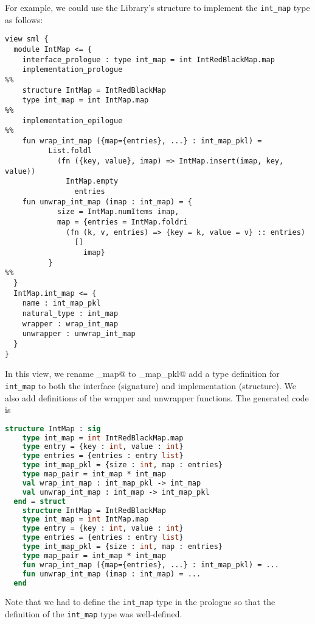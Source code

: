 For example, we could use the \smlnj{} Library's \lstinline@IntRedBlackMap@ structure
to implement the \lstinline!int_map! type as follows:
\begin{code}\begin{lstlisting}[language=ASDL]
view sml {
  module IntMap <= {
    interface_prologue : type int_map = int IntRedBlackMap.map
    implementation_prologue
%%
    structure IntMap = IntRedBlackMap
    type int_map = int IntMap.map
%%
    implementation_epilogue
%%
    fun wrap_int_map ({map={entries}, ...} : int_map_pkl) =
          List.foldl
            (fn ({key, value}, imap) => IntMap.insert(imap, key, value))
              IntMap.empty
                entries
    fun unwrap_int_map (imap : int_map) = {
            size = IntMap.numItems imap,
            map = {entries = IntMap.foldri
              (fn (k, v, entries) => {key = k, value = v} :: entries)
                []
                  imap}
          }
%%
  }
  IntMap.int_map <= {
    name : int_map_pkl
    natural_type : int_map
    wrapper : wrap_int_map
    unwrapper : unwrap_int_map
  }
}
\end{lstlisting}\end{code}%
In this view, we rename \lstinline@int_map@ to \lstinline@int_map_pkl@ add a type
definition for \lstinline!int_map! to both the interface
(signature) and implementation (structure).
We also add definitions of the wrapper and unwrapper functions.
The generated code is
\begin{code}\begin{lstlisting}[language=SML]
structure IntMap : sig
    type int_map = int IntRedBlackMap.map
    type entry = {key : int, value : int}
    type entries = {entries : entry list}
    type int_map_pkl = {size : int, map : entries}
    type map_pair = int_map * int_map
    val wrap_int_map : int_map_pkl -> int_map
    val unwrap_int_map : int_map -> int_map_pkl
  end = struct
    structure IntMap = IntRedBlackMap
    type int_map = int IntMap.map
    type entry = {key : int, value : int}
    type entries = {entries : entry list}
    type int_map_pkl = {size : int, map : entries}
    type map_pair = int_map * int_map
    fun wrap_int_map ({map={entries}, ...} : int_map_pkl) = ...
    fun unwrap_int_map (imap : int_map) = ...
  end
\end{lstlisting}\end{code}%
Note that we had to define the \lstinline[language=SML]@int_map@ type in
the prologue so that the definition of the \lstinline[language=SML]@int_map@
type was well-defined.

